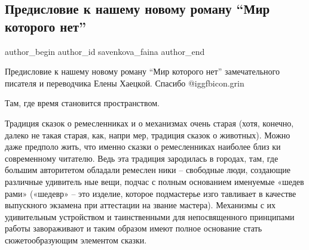  
 
 
 
 
 
\subsection{Предисловие к нашему новому роману \enquote{Мир которого нет}}
\label{sec:23_12_2021.fb.savenkova_faina.1.predislovie_roman_mir_kotorogo_net}
 
\ifcmt
 author_begin
   author_id savenkova_faina
 author_end
\fi

Предисловие к нашему новому роману \enquote{Мир которого нет} замечательного писателя и
переводчика Елены Хаецкой. Спасибо @igg{fbicon.grin} 

Там, где время становится пространством.


Традиция сказок о ремесленниках и о механизмах очень старая (хотя, конечно,
далеко не такая старая, как, напри мер, традиция сказок о животных). Можно даже
предполо жить, что именно сказки о ремесленниках наиболее близ ки современному
читателю. Ведь эта традиция зародилась в городах, там, где большим авторитетом
обладали ремеслен ники – свободные люди, создающие различные удивитель ные
вещи, подчас с полным основанием именуемые «шедев рами» («шедевр» – это
изделие, которое подмастерье изго тавливает в качестве выпускного экзамена при
аттестации на звание мастера). Механизмы с их удивительным устройством и
таинственными для непосвященного принципами работы завораживают и таким образом
имеют полное основание стать сюжетообразующим элементом сказки.

